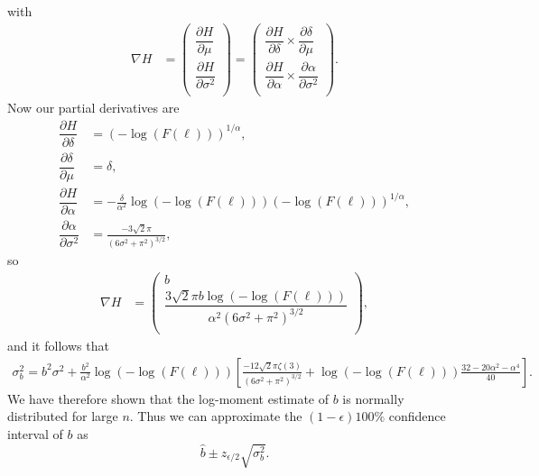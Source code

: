 \documentclass[honours,12pt]{unswthesis}
\newcommand{\1}{\mathbf 1}
\newcommand{\ppartial}[2]{\dfrac{\partial {#1}}{\partial {#2} }}
\numberwithin{equation}{section}
\theoremstyle{definition}
\theoremstyle{remark}
\begin{document}
with
\begin{align*}
	\nabla H &=\begin{pmatrix}
		\ppartial{H}{\mu}\\
		\ppartial{H}{\sigma^2}\\
	\end{pmatrix}
	=\begin{pmatrix}
		\ppartial{H}{\delta}\times\ppartial{\delta}{\mu}\\
		\ppartial{H}{\alpha}\times\ppartial{\alpha}{\sigma^2}\\
	\end{pmatrix}.
\end{align*}
Now our partial derivatives are
\begin{align*}
\ppartial{H}{\delta}&=(-\log(F(\ell)))^{1/\alpha},\\ 
\ppartial{\delta}{\mu}&=\delta,\\
 \ppartial{H}{\alpha}&=-\frac{\delta}{\alpha^2}\log(-\log(F(\ell)))(-\log(F(\ell)))^{1/\alpha},\\ 
 \ppartial{\alpha}{\sigma^2}&=\frac{-3\sqrt{2}\pi}{(6\sigma^2+\pi^2)^{3/2}},
\end{align*}
so
\begin{align*}
	\nabla H &=\begin{pmatrix}
		b\\
		\dfrac{3\sqrt{2}\pi b \log(-\log(F(\ell)))}{\alpha^2(6\sigma^2+\pi^2)^{3/2}} \\
	\end{pmatrix},
\end{align*}
and it follows that
\begin{align*}
 \sigma^2_b= b^2\sigma^2 +\frac{b^2}{\alpha^2}\log(-\log(F(\ell)))
 \left[
 \frac{-12\sqrt{2}\pi\zeta(3)}{(6\sigma^2+\pi^2)^{3/2}} + \log(-\log(F(\ell)))\frac{32-20\alpha^2-\alpha^4}{40}
 \right].
\end{align*}
We have therefore shown that the log-moment estimate of $b$ is normally distributed for large $n$. Thus we can approximate the $(1-\epsilon)100\%$ confidence interval of $b$ as
\[
	\hat{b}\pm z_{\epsilon/2}\sqrt{\sigma^2_b}.
\]


\clearpage
{}


\end{document}
